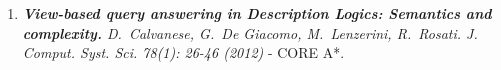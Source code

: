 \begin{enumerate}[topsep=0pt,itemsep=-1ex,partopsep=1ex,parsep=1ex]
\item 
\textit{\textbf{View-based query answering in Description Logics: Semantics and complexity.}
D.\ Calvanese, G.\ De Giacomo, M.\ Lenzerini, R.\ Rosati. J. Comput. Syst. Sci. 78(1): 26-46 (2012)} - CORE  A*. %























\end{enumerate}


